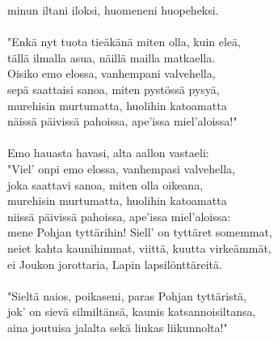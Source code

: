 minun iltani iloksi, huomeneni huopeheksi.               \\
                                                         \\
"Enkä nyt tuota tieäkänä miten olla, kuin eleä,          \\
tällä ilmalla asua, näillä mailla matkaella.             \\
Oisiko emo elossa, vanhempani valvehella,                \\
sepä saattaisi sanoa, miten pystössä pysyä,              \\
murehisin murtumatta, huolihin katoamatta                \\
näissä päivissä pahoissa, ape'issa miel'aloissa!"        \\
                                                         \\
Emo hauasta havasi, alta aallon vastaeli:                \\
"Viel' onpi emo elossa, vanhempasi valvehella,           \\
joka saattavi sanoa, miten olla oikeana,                 \\
murehisin murtumatta, huolihin katoamatta                \\
niissä päivissä pahoissa, ape'issa miel'aloissa:         \\
mene Pohjan tyttärihin! Siell' on tyttäret somemmat,     \\
neiet kahta kaunihimmat, viittä, kuutta virkeämmät,      \\
ei Joukon jorottaria, Lapin lapsilönttäreitä.            \\
                                                         \\
"Sieltä naios, poikaseni, paras Pohjan tyttäristä,       \\
jok' on sievä silmiltänsä, kaunis katsannoisiltansa,     \\
aina joutuisa jalalta sekä liukas liikunnolta!"          \\